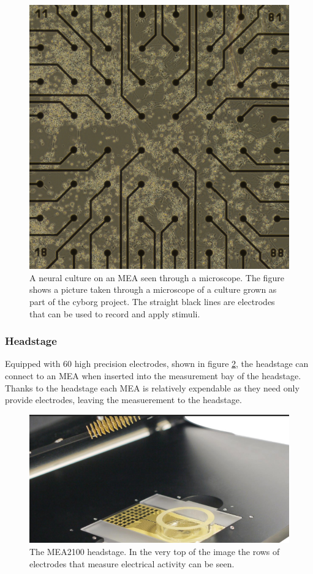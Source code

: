 \begin{figure}[h!]
  \centering
  \includegraphics[width=1\textwidth]{fig/frank.png}
  \caption[Microscopic picture of MEA]{
    A neural culture on an MEA seen through a microscope.
    The figure shows a picture taken through a microscope of a culture grown as
    part of the cyborg project.
    The straight black lines are electrodes that can be used to record and apply
    stimuli.
  }
  \label{frank}
\end{figure}
\clearpage
\subsubsection{Headstage}
Equipped with 60 high precision electrodes, shown in figure \ref{openHeadstage}, the
headstage can connect to an MEA when inserted into the measurement bay of the
headstage.
Thanks to the headstage each MEA is relatively expendable as they need only
provide electrodes, leaving the measuerement to the headstage.
\begin{figure}[h!]
  \centering
  \includegraphics[width=1\textwidth]{fig/hs_placeholder.png}
  \caption[MEA2100 headstage]{
    The MEA2100 headstage. In the very top of the image the rows of electrodes
    that measure electrical activity can be seen.
  }
  \label{openHeadstage}
\end{figure}
